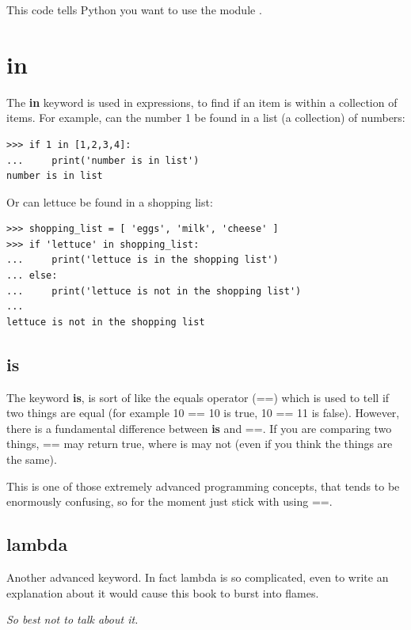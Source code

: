 This code tells Python you want to use the module .

\section*{in}

The \textbf{in} keyword is used in expressions, to find if an item is within a collection of items. For example, can the number 1 be found in a list (a collection) of numbers:

\begin{listing}
\begin{verbatim}
>>> if 1 in [1,2,3,4]:
...     print('number is in list')
number is in list
\end{verbatim}
\end{listing}

\noindent
Or can lettuce be found in a shopping list:

\begin{listing}
\begin{verbatim}
>>> shopping_list = [ 'eggs', 'milk', 'cheese' ]
>>> if 'lettuce' in shopping_list:
...     print('lettuce is in the shopping list')
... else:
...     print('lettuce is not in the shopping list')
...
lettuce is not in the shopping list
\end{verbatim}
\end{listing}

\subsection*{is}

The keyword \textbf{is}, is sort of like the equals operator (==) which is used to tell if two things are equal (for example 10 == 10 is true, 10 == 11 is false).  However, there is a fundamental difference between \textbf{is} and ==. If you are comparing two things, == may return true, where is may not (even if you think the things are the same). 
\par
This is one of those extremely advanced programming concepts, that tends to be enormously confusing, so for the moment just stick with using ==.

\subsection*{lambda}

Another advanced keyword. In fact lambda is so complicated, even to write an explanation about it would cause this book to burst into flames.
\par
\emph{So best not to talk about it.}

